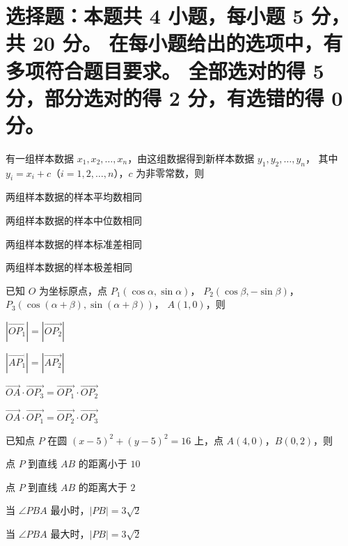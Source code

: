 \documentclass{exam-zh}
\begin{document}
\section{%
  选择题：本题共 4 小题，每小题 5 分，共 20 分。
  在每小题给出的选项中，有多项符合题目要求。
  全部选对的得 5 分，部分选对的得 2 分，有选错的得 0 分。
}

\begin{question}
  有一组样本数据 $x_1, x_2, \dots, x_n$，由这组数据得到新样本数据 $y_1, y_2, \dots, y_n$，
  其中 $y_i = x_i + c$（$i = 1, 2, \dots, n$），$c$ 为非零常数，则 \paren
  \begin{choices}
    \item 两组样本数据的样本平均数相同
    \item 两组样本数据的样本中位数相同
    \item 两组样本数据的样本标准差相同
    \item 两组样本数据的样本极差相同
  \end{choices}
\end{question}

\begin{question}
  已知 $O$ 为坐标原点，点
  $P_1(\cos\alpha,  \sin\alpha)$，
  $P_2(\cos\beta , -\sin\beta)$，
  $P_3(\cos(\alpha + \beta),  \sin(\alpha + \beta))$，
  $A(1, 0)$，则 \paren
  \begin{choices}
    \item $|\overrightarrow{OP_1}| = |\overrightarrow{OP_2}|$
    \item $|\overrightarrow{AP_1}| = |\overrightarrow{AP_2}|$
    \item $\overrightarrow{OA} \cdot \overrightarrow{OP_3}
      = \overrightarrow{OP_1} \cdot \overrightarrow{OP_2}$
    \item $\overrightarrow{OA} \cdot \overrightarrow{OP_1}
      = \overrightarrow{OP_2} \cdot \overrightarrow{OP_3}$
  \end{choices}
\end{question}

\begin{question}
  已知点 $P$ 在圆 $(x - 5)^2 + (y - 5)^2 = 16$ 上，点 $A(4, 0)$，$B(0, 2)$，则 \paren
  \begin{choices}
    \item 点 $P$ 到直线 $AB$ 的距离小于 $10$
    \item 点 $P$ 到直线 $AB$ 的距离大于 $2$
    \item 当 $\angle PBA$ 最小时，$|PB| = 3 \sqrt{2}$
    \item 当 $\angle PBA$ 最大时，$|PB| = 3 \sqrt{2}$
  \end{choices}
\end{question}
\end{document}
